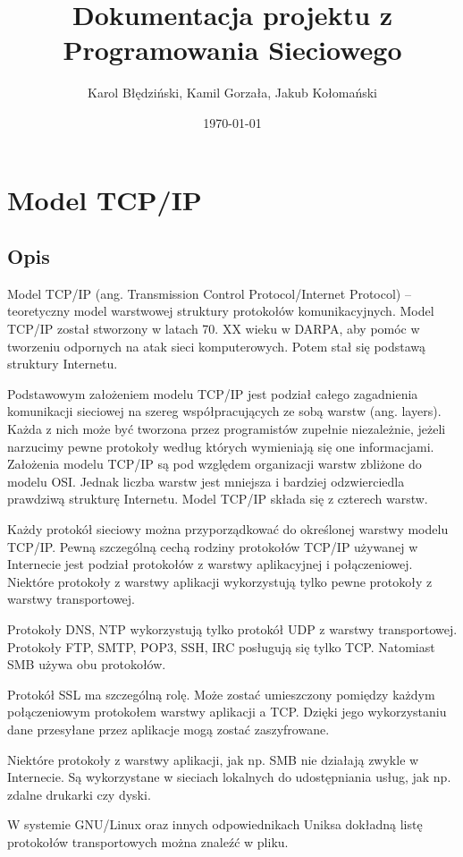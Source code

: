 \documentclass{article}
\title{Dokumentacja projektu z Programowania Sieciowego}
\date{\today}
\author{Karol Błędziński, Kamil Gorzała, Jakub Kołomański}
\begin{document}
 \maketitle
 \newpage
 \newpage
 \section{Model TCP/IP}
\subsection{Opis}
	Model TCP/IP (ang. Transmission Control Protocol/Internet Protocol) – teoretyczny model warstwowej struktury protokołów komunikacyjnych. Model TCP/IP został stworzony w latach 70. XX wieku w DARPA, aby pomóc w tworzeniu odpornych na atak sieci komputerowych. Potem stał się podstawą struktury Internetu.
	
Podstawowym założeniem modelu TCP/IP jest podział całego zagadnienia komunikacji sieciowej na szereg współpracujących ze sobą warstw (ang. layers). Każda z nich może być tworzona przez programistów zupełnie niezależnie, jeżeli narzucimy pewne protokoły według których wymieniają się one informacjami. Założenia modelu TCP/IP są pod względem organizacji warstw zbliżone do modelu OSI. Jednak liczba warstw jest mniejsza i bardziej odzwierciedla prawdziwą strukturę Internetu. Model TCP/IP składa się z czterech warstw.

Każdy protokół sieciowy można przyporządkować do określonej warstwy modelu TCP/IP. Pewną szczególną cechą rodziny protokołów TCP/IP używanej w Internecie jest podział protokołów z warstwy aplikacyjnej i połączeniowej. Niektóre protokoły z warstwy aplikacji wykorzystują tylko pewne protokoły z warstwy transportowej.

Protokoły DNS, NTP wykorzystują tylko protokół UDP z warstwy transportowej. Protokoły FTP, SMTP, POP3, SSH, IRC posługują się tylko TCP. Natomiast SMB używa obu protokołów.

Protokół SSL ma szczególną rolę. Może zostać umieszczony pomiędzy każdym połączeniowym protokołem warstwy aplikacji a TCP. Dzięki jego wykorzystaniu dane przesyłane przez aplikacje mogą zostać zaszyfrowane.

Niektóre protokoły z warstwy aplikacji, jak np. SMB nie działają zwykle w Internecie. Są wykorzystane w sieciach lokalnych do udostępniania usług, jak np. zdalne drukarki czy dyski.

W systemie GNU/Linux oraz innych odpowiednikach Uniksa dokładną listę protokołów transportowych można znaleźć w pliku.
\end{document}
